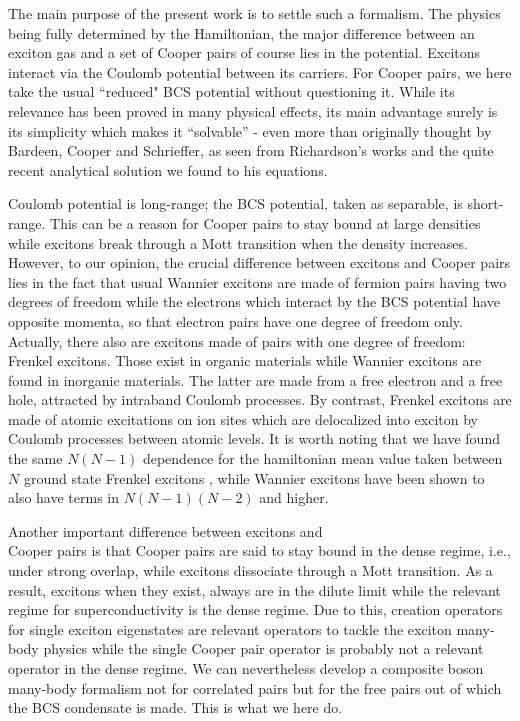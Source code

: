 \documentclass[epj]{svjour}
\begin{document}
The main purpose of the present work is to settle such a formalism. The physics being fully determined by the Hamiltonian, the major difference between an exciton gas and a set of Cooper pairs of course lies in the potential. Excitons interact via the Coulomb potential between its carriers. For Cooper pairs, we here take the usual ``reduced" BCS potential without questioning it. While its relevance has been proved in many physical effects, its main advantage surely is its simplicity which makes it ``solvable'' - even more than originally thought by Bardeen, Cooper and Schrieffer, as seen from Richardson's works and the quite recent analytical solution we found to his equations\cite{Richardson1,Ushveridze,ortiz}.
 
  Coulomb potential is long-range; the BCS potential, taken as separable, is short-range. This can be a reason for Cooper pairs to stay bound at large densities while excitons break through a Mott transition when the density increases. However, to our opinion, the crucial difference between excitons and Cooper pairs lies in the fact that usual Wannier excitons  are made of fermion pairs having two degrees of freedom while the electrons which interact by the BCS potential have opposite momenta, so that electron pairs have one degree of freedom only.  Actually, there also are excitons made of pairs with one degree of freedom: Frenkel excitons. Those exist in organic materials while Wannier excitons are found in inorganic materials. The latter are made from a free electron and a free hole, attracted by intraband Coulomb processes. By contrast, Frenkel excitons are made of atomic excitations on ion sites which are delocalized into exciton by Coulomb processes between atomic levels.  It is worth noting that we have found the same  $N(N-1)$ dependence for the hamiltonian mean value taken between $N$ ground state Frenkel excitons \cite{frenkel}, while Wannier excitons have been shown to also have terms in $N(N-1)(N-2)$ and higher\cite{monicOdil}.




 Another important difference between excitons and \\Cooper pairs is that Cooper pairs are said to stay bound in the dense regime, i.e., under strong overlap, while excitons dissociate through a Mott transition. As a result, excitons when they exist, always are in the dilute limit while the relevant regime for superconductivity is the dense regime. Due to this, creation operators for single exciton eigenstates are relevant operators to tackle the exciton many-body physics while the single Cooper pair operator is probably not a relevant operator in the dense regime. We can nevertheless develop a composite boson many-body formalism not for correlated pairs but for the free pairs out of which the BCS condensate is made. This is what we here do.
\end{document}

